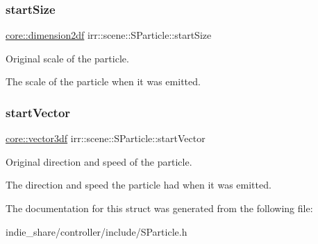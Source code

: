 \subsubsection{\texorpdfstring{start\+Size}{startSize}}
{\footnotesize\ttfamily \hyperlink{namespaceirr_1_1core_a54f0e5b7416e6dce5a0f6213f00a580f}{core\+::dimension2df} irr\+::scene\+::\+S\+Particle\+::start\+Size}



Original scale of the particle. 

The scale of the particle when it was emitted. \mbox{\label{structirr_1_1scene_1_1SParticle_a5e8b1dcb8825e467b6ed2d4f48c321e2}} 
\subsubsection{\texorpdfstring{start\+Vector}{startVector}}
{\footnotesize\ttfamily \hyperlink{namespaceirr_1_1core_ae6e2b2a6c552833ebbd5b7463d03586b}{core\+::vector3df} irr\+::scene\+::\+S\+Particle\+::start\+Vector}



Original direction and speed of the particle. 

The direction and speed the particle had when it was emitted. 

The documentation for this struct was generated from the following file\+:\begin{DoxyCompactItemize}
\item 
indie\+\_\+share/controller/include/S\+Particle.\+h\end{DoxyCompactItemize}
